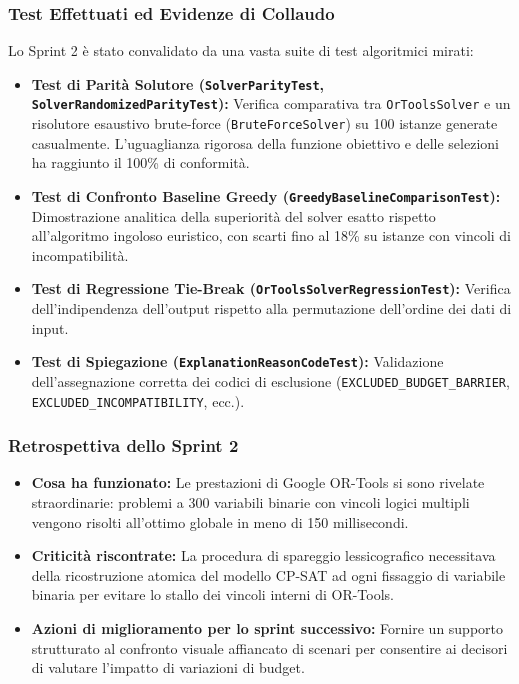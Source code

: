 \subsubsection{Test Effettuati ed Evidenze di Collaudo}
Lo Sprint 2 è stato convalidato da una vasta suite di test algoritmici mirati:
\begin{itemize}[leftmargin=1.4em, itemsep=0.2em]
    \item \textbf{Test di Parità Solutore (\texttt{SolverParityTest}, \texttt{SolverRandomizedParityTest}):} Verifica comparativa tra \texttt{OrToolsSolver} e un risolutore esaustivo brute-force (\texttt{BruteForceSolver}) su 100 istanze generate casualmente. L'uguaglianza rigorosa della funzione obiettivo e delle selezioni ha raggiunto il 100\% di conformità.
    \item \textbf{Test di Confronto Baseline Greedy (\texttt{GreedyBaselineComparisonTest}):} Dimostrazione analitica della superiorità del solver esatto rispetto all'algoritmo ingoloso euristico, con scarti fino al 18\% su istanze con vincoli di incompatibilità.
    \item \textbf{Test di Regressione Tie-Break (\texttt{OrToolsSolverRegressionTest}):} Verifica dell'indipendenza dell'output rispetto alla permutazione dell'ordine dei dati di input.
    \item \textbf{Test di Spiegazione (\texttt{ExplanationReasonCodeTest}):} Validazione dell'assegnazione corretta dei codici di esclusione (\texttt{EXCLUDED\_BUDGET\_BARRIER}, \texttt{EXCLUDED\_INCOMPATIBILITY}, ecc.).
\end{itemize}

\subsubsection{Retrospettiva dello Sprint 2}
\begin{itemize}[leftmargin=1.4em, itemsep=0.2em]
    \item \textbf{Cosa ha funzionato:} Le prestazioni di Google OR-Tools si sono rivelate straordinarie: problemi a 300 variabili binarie con vincoli logici multipli vengono risolti all'ottimo globale in meno di 150 millisecondi.
    \item \textbf{Criticità riscontrate:} La procedura di spareggio lessicografico necessitava della ricostruzione atomica del modello CP-SAT ad ogni fissaggio di variabile binaria per evitare lo stallo dei vincoli interni di OR-Tools.
    \item \textbf{Azioni di miglioramento per lo sprint successivo:} Fornire un supporto strutturato al confronto visuale affiancato di scenari per consentire ai decisori di valutare l'impatto di variazioni di budget.
\end{itemize}

